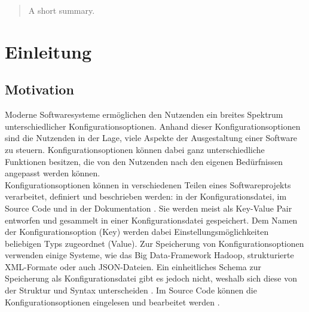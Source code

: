 \documentclass[german,bachelor]{swsLeipzig}
\begin{document}
\begin{frontmatter}
  \begin{abstract}
    A short summary.
  \end{abstract}

  \tableofcontents


  \listoffigures %

  \listoftables %


\end{frontmatter}

\chapter{Einleitung}\label{Einleitung}

\section{Motivation}
Moderne Softwaresysteme erm\"oglichen den Nutzenden ein breites Spektrum unterschiedlicher Konfigurationsoptionen.
Anhand dieser Konfigurationsoptionen sind die Nutzenden in der Lage, viele Aspekte der Ausgestaltung einer Software zu steuern.
Konfigurationsoptionen k\"onnen dabei ganz unterschiedliche Funktionen besitzen, die von den Nutzenden nach den eigenen Bed\"urfnissen angepasst werden k\"onnen.\\

Konfigurationsoptionen können in verschiedenen Teilen eines Softwareprojekts verarbeitet, definiert und beschrieben werden:
in der Konfigurationsdatei, im Source Code und in der Dokumentation \cite[]{7774519}.
Sie werden meist als Key-Value Pair entworfen und gesammelt in einer Konfigurationsdatei gespeichert.
Dem Namen der Konfigurationsoption (Key) werden dabei Einstellungsmöglichkeiten beliebigen Typs zugeordnet (Value).
Zur Speicherung von Konfigurationsoptionen verwenden einige Systeme, wie das Big Data-Framework Hadoop, strukturierte XML-Formate oder auch JSON-Dateien.
Ein einheitliches Schema zur Speicherung als Konfigurationsdatei gibt es jedoch nicht, weshalb sich diese von der Struktur und Syntax unterscheiden \cite[]{10.1145/1985793.1985812}.
Im Source Code können die Konfigurationsoptionen eingelesen und bearbeitet werden \cite[]{7774519}.\\
\end{document}
